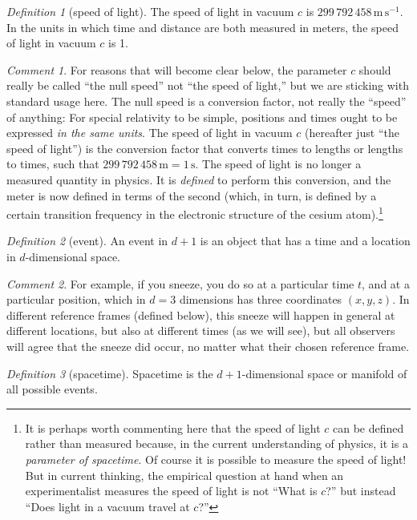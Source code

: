 \documentclass[10pt]{article}
\newcounter{par}
\theoremstyle{remark}
\newtheorem{definition}{Definition}
\theoremstyle{remark}
\newtheorem*{remark}{Comment}
\newcommand{\unit}[1]{\mathrm{#1}}
\newcommand{\m}{\unit{m}}
\newcommand{\s}{\unit{s}}
\begin{document}
\begin{definition}[speed of light]
    The speed of light in vacuum $c$ is $299\,792\,458\,\m\,\s^{-1}$.
    In the units in which time and distance are both measured in meters, the speed of light in vacuum $c$ is 1.
\end{definition}
\begin{remark}
    For reasons that will become clear below, the parameter $c$ should really be called ``the null speed'' not ``the speed of light,'' but we are sticking with standard usage here.
    The null speed is a conversion factor, not really the ``speed'' of anything:
    For special relativity to be simple, positions and times ought to be expressed \emph{in the same units}.
    The speed of light in vacuum $c$ (hereafter just ``the speed of light'') is the conversion factor that converts times to lengths or lengths to times, such that $299\,792\,458\,\m = 1\,\s$.
    The speed of light is no longer a measured quantity in physics.
    It is \emph{defined} to perform this conversion, and the meter is now defined in terms of the second (which, in turn, is defined by a certain transition frequency in the electronic structure of the cesium atom).\footnote{%
        It is perhaps worth commenting here that the speed of light $c$ can be defined rather than measured because, in the current understanding of physics, it is a \emph{parameter of spacetime}.
        Of course it is possible to measure the speed of light!
        But in current thinking, the empirical question at hand when an experimentalist measures the speed of light is not ``What is $c$?'' but instead ``Does light in a vacuum travel at $c$?''}
\end{remark}

\begin{definition}[event]
    An event in $d+1$ is an object that has a time and a location in $d$-dimensional space.
\end{definition}
\begin{remark}
    For example, if you sneeze, you do so at a particular time $t$, and at a particular position, which in $d=3$ dimensions has three coordinates $(x, y, z)$.
    In different reference frames (defined below), this sneeze will happen in general at different locations, but also at different times (as we will see), but all observers will agree that the sneeze did occur, no matter what their chosen reference frame.
\end{remark}

\begin{definition}[spacetime]
    Spacetime is the $d+1$-dimensional space or manifold of all possible events.
\end{definition}
\end{document}
